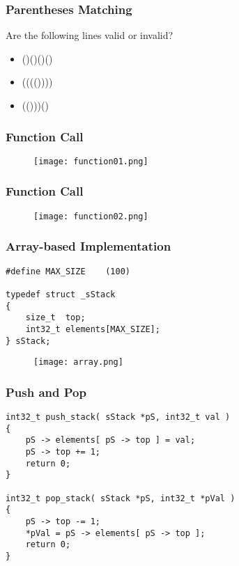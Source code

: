 \documentclass[11pt]{beamer}
\begin{document}
\begin{frame}
\frametitle{Parentheses Matching}
Are the following lines valid or invalid?
\begin{itemize}
\item ()()()()
\item (((())))
\item (()))()
\end{itemize}
\end{frame}

\begin{frame}
\frametitle{Function Call}
\begin{figure}
\centering
\texttt{[image: function01.png]}
\end{figure}
\end{frame}

\begin{frame}
\frametitle{Function Call}
\begin{figure}
\centering
\texttt{[image: function02.png]}
\end{figure}
\end{frame}

\begin{frame}[fragile]
\frametitle{Array-based Implementation}
\begin{lstlisting}
#define MAX_SIZE    (100)

typedef struct _sStack
{
    size_t  top;
    int32_t elements[MAX_SIZE];
} sStack;
\end{lstlisting}
\begin{figure}
\centering
\texttt{[image: array.png]}
\end{figure}
\end{frame}

\begin{frame}[fragile]
\frametitle{Push and Pop}
\begin{lstlisting}
int32_t push_stack( sStack *pS, int32_t val )
{
    pS -> elements[ pS -> top ] = val;
    pS -> top += 1;
    return 0;
}

int32_t pop_stack( sStack *pS, int32_t *pVal )
{
    pS -> top -= 1;
    *pVal = pS -> elements[ pS -> top ];    
    return 0;
}
\end{lstlisting}
\end{frame}
\end{document}
